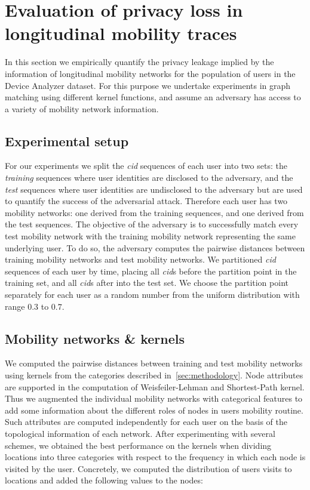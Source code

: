 \section{Evaluation of privacy loss in longitudinal mobility traces}

In this section we empirically quantify the privacy leakage implied by the information of longitudinal mobility networks for the population of users in the Device Analyzer dataset.
For this purpose we undertake experiments in graph matching using different kernel functions, and assume an adversary has access to a variety of mobility network information.

\subsection{Experimental setup}

For our experiments we split the \emph{cid} sequences of each user into two sets: the \emph{training} sequences where user identities are disclosed to the adversary, and the \emph{test} sequences where user identities are undisclosed to the adversary but are used to quantify the success of the adversarial attack.
Therefore each user has two mobility networks: one derived from the training sequences, and one derived from the test sequences.
The objective of the adversary is to successfully match every test mobility network with the training mobility network representing the same underlying user.
To do so, the adversary computes the pairwise distances between training mobility networks and test mobility networks.
We partitioned \emph{cid} sequences of each user by time, placing all \emph{cid}s before the partition point in the training set, and all \emph{cid}s after into the test set.
We choose the partition point separately for each user as a random number from the uniform distribution with range $ 0.3 $ to $ 0.7 $.

\subsection{Mobility networks \& kernels}

We computed the pairwise distances between training and test mobility networks using kernels from the categories described in~\cref{sec:methodology}.
Node attributes are supported in the computation of Weisfeiler-Lehman and Shortest-Path kernel.
Thus we augmented the individual mobility networks with categorical features to add some information about the different roles of nodes in users mobility routine.
Such attributes are computed independently for each user on the basis of the topological information of each network.
After experimenting with several schemes, we obtained the best performance on the kernels when dividing locations into three categories with respect to the frequency in which each node is visited by the user.
Concretely, we computed the distribution of users visits to locations and added the following values to the nodes:

